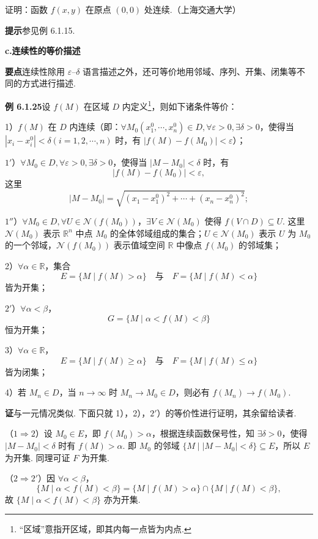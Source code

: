 \documentclass[UTF8, 12pt, fontset=fandol, oneside]{ctexart}
\begin{document}
证明：函数 $f(x,y)$ 在原点 $(0,0)$ 处连续.（上海交通大学）

\noindent\textbf{提示}\quad 参见例 6.1.15.

\noindent\textbf{c.\quad 连续性的等价描述}

\noindent\textbf{要点}\quad 连续性除用 $\varepsilon$--$\delta$ 语言描述之外，还可等价地用邻域、序列、开集、闭集等不同的方式进行描述.

\noindent\textbf{例 6.1.25}\quad 设 $f(M)$ 在区域 $D$ 内定义\footnote{“区域”意指开区域，即其内每一点皆为内点.}，则如下诸条件等价：

1）$f(M)$ 在 $D$ 内连续（即：$\forall M_0(x_1^0,\cdots,x_n^0)\in D,\forall\varepsilon>0,\exists\delta>0$，使得当 $|x_i-x_i^0|<\delta(i=1,2,\cdots,n)$ 时，有 $|f(M)-f(M_0)|<\varepsilon$）；

$1'$）$\forall M_0\in D,\forall\varepsilon>0,\exists\delta>0$，使得当 $|M-M_0|<\delta$ 时，有
\[
  |f(M)-f(M_0)|<\varepsilon,
\]
这里
\[
  |M-M_0|=\sqrt{(x_1-x_1^0)^2+\cdots+(x_n-x_n^0)^2};
\]

$1''$）$\forall M_0\in D,\forall U\in\mathcal{N}(f(M_0))$，$\exists V\in\mathcal{N}(M_0)$ 使得 $f(V\cap D)\subseteq U$. 这里 $\mathcal{N}(M_0)$ 表示 $\mathbb{R}^n$ 中点 $M_0$ 的全体邻域组成的集合；$U\in\mathcal{N}(M_0)$ 表示 $U$ 为 $M_0$ 的一个邻域，$\mathcal{N}(f(M_0))$ 表示值域空间 $\mathbb{R}$ 中像点 $f(M_0)$ 的邻域集；

2）$\forall\alpha\in\mathbb{R}$，集合
\[
  E=\{M\mid f(M)>\alpha\}\quad\text{与}\quad
  F=\{M\mid f(M)<\alpha\}
\]
皆为开集；

$2'$）$\forall\alpha<\beta$，
\[
  G=\{M\mid \alpha<f(M)<\beta\}
\]
恒为开集；

3）$\forall\alpha\in\mathbb{R}$，
\[
  E=\{M\mid f(M)\ge\alpha\}\quad\text{与}\quad
  F=\{M\mid f(M)\le\alpha\}
\]
皆为闭集；

4）若 $M_n\in D$，当 $n\to\infty$ 时 $M_n\to M_0\in D$，则必有 $f(M_n)\to f(M_0)$.

\noindent\textbf{证}\quad 与一元情况类似. 下面只就 1），2），$2'$）的等价性进行证明，其余留给读者.

（$1\Rightarrow2$）设 $M_0\in E$，即 $f(M_0)>\alpha$，根据连续函数保号性，知 $\exists\delta>0$，使得 $|M-M_0|<\delta$ 时有 $f(M)>\alpha$. 即 $M_0$ 的邻域 $\{M\mid |M-M_0|<\delta\}\subseteq E$，所以 $E$ 为开集. 同理可证 $F$ 为开集.

（$2\Rightarrow2'$）因 $\forall\alpha<\beta$，
\[
  \{M\mid \alpha<f(M)<\beta\}
  =\{M\mid f(M)>\alpha\}\cap\{M\mid f(M)<\beta\},
\]
故 $\{M\mid \alpha<f(M)<\beta\}$ 亦为开集.
\end{document}
